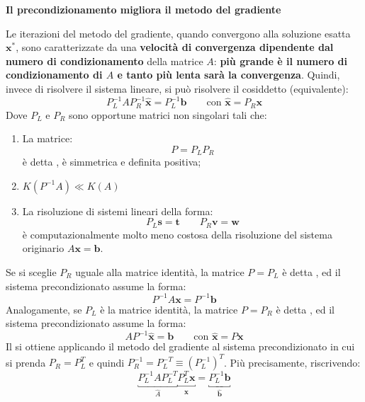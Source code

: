 \highspace
\begin{flushleft}
    \textcolor{Red2}{ \textbf{Il precondizionamento migliora il metodo del gradiente}}
\end{flushleft}
Le iterazioni del metodo del gradiente, quando convergono alla soluzione esatta $\mathbf{x}^{*}$, sono caratterizzate da una \textbf{velocità di convergenza dipendente dal numero di condizionamento} della matrice $A$: \textbf{più grande è il numero di condizionamento di $A$ e tanto più lenta sarà la convergenza}. Quindi, invece di risolvere il sistema lineare, si può risolvere il cosiddetto  (equivalente):
\begin{equation}
    P_{L}^{-1}A P_{R}^{-1} \widehat{\mathbf{x}} = P_{L}^{-1}\mathbf{b} \hspace{2em} \text{con } \widehat{\mathbf{x}} = P_{R}\mathbf{x}
\end{equation}
Dove $P_{L}$ e $P_{R}$ sono opportune matrici non singolari tali che:
\begin{enumerate}
    \item La matrice:
    \begin{equation}
        P = P_{L}P_{R}
    \end{equation}
    è detta , è simmetrica e definita positiva;

    \item $K\left(P^{-1}A\right) \ll K\left(A\right)$
    
    \item La risoluzione di sistemi lineari della forma:
    \begin{equation}
        P_{L}\mathbf{s} = \mathbf{t} \hspace{2em} P_{R}\mathbf{v} = \mathbf{w}
    \end{equation}
    è computazionalmente molto meno costosa della risoluzione del sistema originario $A\mathbf{x} = \mathbf{b}$.
\end{enumerate}
Se si sceglie $P_{R}$ uguale alla matrice identità, la matrice $P = P_{L}$ è detta , ed il sistema precondizionato assume la forma:
\begin{equation}
    P^{-1}A\mathbf{x} = P^{-1}\mathbf{b}
\end{equation}
Analogamente, se $P_{L}$ è la matrice identità, la matrice $P = P_{R}$ è detta , ed il sistema precondizionato assume la forma:
\begin{equation}
    AP^{-1}\widehat{\mathbf{x}} = \mathbf{b} \hspace{2em} \text{con }\widehat{\mathbf{x}} = P\mathbf{x}
\end{equation}
Il  si ottiene applicando il metodo del gradiente al sistema precondizionato in cui si prenda $P_{R} = P_{L}^{T}$ e quindi $P_{R}^{-1} = P_{L}^{-T} \equiv \left(P_{L}^{-1}\right)^{T}$. Più precisamente, riscrivendo:
\begin{equation}
    \underbracket{P_{L}^{-1}AP_{L}^{-T}}_{\widehat{A}} \underbracket{P_{L}^{T}\mathbf{x}}_{\widehat{\mathbf{x}}} = \underbracket{P_{L}^{-1} \mathbf{b}}_{\widehat{\mathbf{b}}}
\end{equation}
